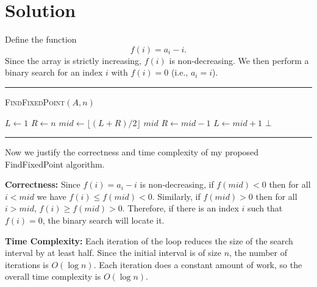 \documentclass[11pt]{article}
\begin{document}
    \section*{Solution}

    Define the function
    \[
    f(i) = a_i - i.
    \]
    Since the array is strictly increasing, \(f(i)\) is non-decreasing. We then perform a binary search for an index \(i\) with \(f(i)=0\) (i.e., \(a_i=i\)).

    \par\noindent\rule{\textwidth}{0.4pt}
    \smallskip        
    \textsc{FindFixedPoint}$(A, n)$
    \begin{algorithmic}[1]
        \STATE $L \gets 1$
        \STATE $R \gets n$
            \STATE $mid \gets \lfloor (L+R)/2 \rfloor$
                \RETURN $mid$
                \STATE $R \gets mid - 1$
            \ELSE
                \STATE $L \gets mid + 1$
            \ENDIF
        \ENDWHILE
        \RETURN $\bot$
    \end{algorithmic}
    \vspace{-2mm}
    \par\noindent\rule{\textwidth}{0.4pt}
    
    Now we justify the correctness and time complexity of my proposed FindFixedPoint algorithm.

    \textbf{Correctness:}  
    Since \(f(i)=a_i-i\) is non-decreasing, if \(f(mid) < 0\) then for all \(i < mid\) we have \(f(i) \leq f(mid) < 0\). 
    Similarly, if \(f(mid) > 0\) then for all \(i > mid\), \(f(i) \geq f(mid) > 0\). 
    Therefore, if there is an index \(i\) such that \(f(i)=0\), the binary search will locate it.
    \smallskip

    \textbf{Time Complexity:}  
    Each iteration of the loop reduces the size of the search interval by at least half. 
    Since the initial interval is of size \( n \), the number of iterations is \( O(\log n) \). 
    Each iteration does a constant amount of work, so the overall time complexity is \( O(\log n) \).
    
    \newpage
    
\end{document}
